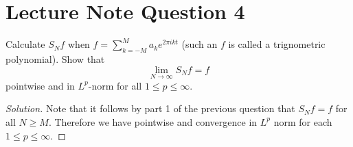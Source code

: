 \section{Lecture Note Question 4}
\horz
Calculate $S_N f$ when $f= \sum_{k=-M}^{M} a_{k} e^{2\pi i kt}$ (such an $f$ is called a trignometric polynomial). Show that 
\begin{equation*}
\lim_{N\to \infty} S_{N} f= f
\end{equation*}
pointwise and in $L^{p}$-norm for all $1 \le p \le \infty$.
\horz

\begin{proof}[Solution]
Note that it follows by part 1 of the previous question that $S_{N}f = f$ for all $N\ge M$. Therefore we have pointwise and convergence in $L^{p}$ norm for each $1\le p \le \infty$.
\end{proof}
